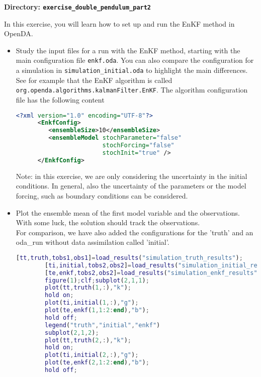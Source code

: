 {\bf Directory: {\tt exercise\_double\_pendulum\_part2}}

In this exercise, you will learn how to set up and run the EnKF method in OpenDA.

\begin{itemize}
  \item Study the input files for a run with the EnKF method, starting with the main configuration file
      \texttt{enkf.oda}. You can also compare the configuration for a simulation in 
      \texttt{simulation\_initial.oda} to highlight the main differences. 
      See for example that the EnKF algorithm is called \verb|org.openda.algorithms.kalmanFilter.EnKF|. 
      The algorithm configuration file has the following content
      \begin{lstlisting}[language=XML,frame=single,caption={XML input for EnKF algorithm}]
      <?xml version="1.0" encoding="UTF-8"?>
      <EnkfConfig>
         <ensembleSize>10</ensembleSize>
         <ensembleModel stochParameter="false"
                        stochForcing="false"
                        stochInit="true" />
      </EnkfConfig>
      \end{lstlisting}
      Note: in this exercise, we are only considering the uncertainty in the initial conditions. In general, also the uncertainty of the 
      parameters or the model forcing, such as boundary conditions can be considered.

  \item Plot the ensemble mean of the first model variable and the observations.
        With some luck, the solution should track the observations. \\
        For comparison, we have also added the configurations for the 'truth' and an oda\_run
        without data assimilation called 'initial'.
        
\ifshowmatlab
        \begin{lstlisting}[language=Matlab,frame=single,caption={Matlab}]
        [tt,truth,tobs1,obs1]=load_results("simulation_truth_results");
        [ti,initial,tobs2,obs2]=load_results("simulation_initial_results");
        [te,enkf,tobs2,obs2]=load_results("simulation_enkf_results");
        figure(1);clf;subplot(2,1,1);
        plot(tt,truth(1,:),"k");
        hold on;
        plot(ti,initial(1,:),"g");
        plot(te,enkf(1,1:2:end),"b");
        hold off;
        legend("truth","initial","enkf")
        subplot(2,1,2);
        plot(tt,truth(2,:),"k");
        hold on;
        plot(ti,initial(2,:),"g");
        plot(te,enkf(2,1:2:end),"b");
        hold off;
        \end{lstlisting}
\fi


\end{itemize}
